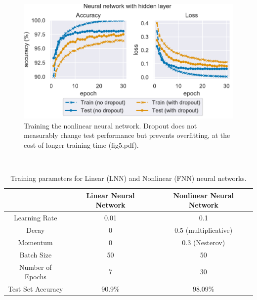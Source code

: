 \documentclass{article}
\begin{document}
\noindent \\
\begin{figure}[H]
        \centering
        \includegraphics[scale=0.8]{fig5.pdf}
        \caption[width=7in]{
          Training the nonlinear neural network. Dropout does not measurably change test performance but prevents overfitting, at the cost of longer training time (fig5.pdf).
          \label{zfigure5}
          }
\end{figure}

\noindent \\
\begin{table}
  \centering
 \caption[width=7in]{
    Training parameters for Linear (LNN) and Nonlinear (FNN) neural networks.
    \label{ztable3}
    }
 \begin{tabular}{ccc}
 \toprule
      & Linear Neural Network & Nonlinear Neural Network \\
 \midrule
Learning Rate & 0.01 & 0.1 \\
 Decay  & 0 & 0.5 (multiplicative)\\
Momentum & 0 & 0.3 (Nesterov) \\
Batch Size & 50 & 50 \\
Number of Epochs & 7 & 30 \\
Test Set Accuracy & 90.9\% & 98.09\% \\
 \bottomrule
\end{tabular}
\end{table}
\end{document}
